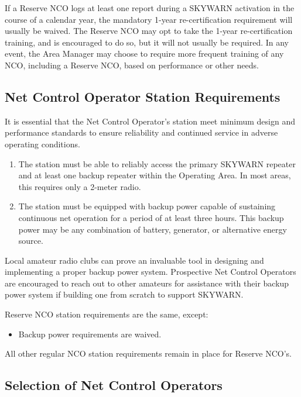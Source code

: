 \documentclass[pdflatex,letterpaper,twoside,12pt]{book}
\begin{document}
If a Reserve NCO logs at least one report during a SKYWARN activation in the course of a calendar year, the mandatory 1-year re-certification requirement will usually be waived.  The Reserve NCO may opt to take the 1-year re-certification training, and is encouraged to do so, but it will not usually be required.  In any event, the Area Manager may choose to require more frequent training of any NCO, including a Reserve NCO, based on performance or other needs.

\subsection{Net Control Operator Station Requirements}\label{nco-station}

It is essential that the Net Control Operator's station meet minimum design and performance standards to ensure reliability and continued service in adverse operating conditions.

\begin{enumerate}
\item The station must be able to reliably access the primary SKYWARN repeater and at least one backup repeater within the Operating Area.  In most areas, this requires only a 2-meter radio.
\item The station must be equipped with backup power capable of sustaining continuous net operation for a period of at least three hours.  This backup power may be any combination of battery, generator, or alternative energy source.
\end{enumerate}

Local amateur radio clubs can prove an invaluable tool in designing and implementing a proper backup power system.  Prospective Net Control Operators are encouraged to reach out to other amateurs for assistance with their backup power system if building one from scratch to support SKYWARN.

Reserve NCO station requirements are the same, except:

\begin{itemize}
\item Backup power requirements are waived.
\end{itemize}

All other regular NCO station requirements remain in place for Reserve NCO's.

\subsection{Selection of Net Control Operators}
\end{document}
